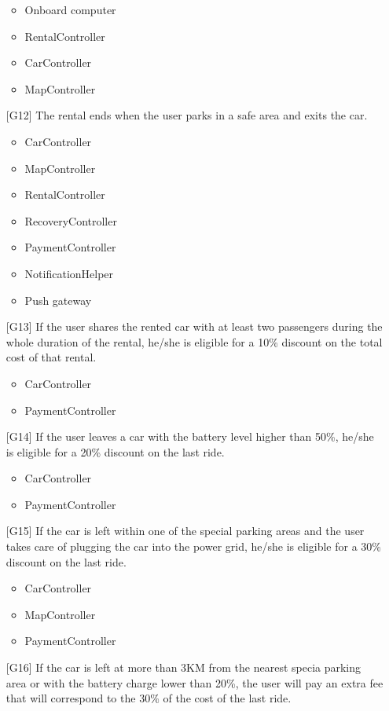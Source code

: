 \begin{itemize}
		\begin{itemize}
			\item Onboard computer
			\item RentalController
			\item CarController
			\item MapController
		\end{itemize}
	\item[{[G12]}] The rental ends when the user parks in a safe area and exits the car.
		\begin{itemize}
			\item CarController
			\item MapController
			\item RentalController
			\item RecoveryController
			\item PaymentController
			\item NotificationHelper
			\item Push gateway
		\end{itemize}
	\item[{[G13]}] If the user shares the rented car with at least two passengers during the whole duration of the rental, he/she is eligible for a 10\% discount on the total cost of that rental.
		\begin{itemize}
			\item CarController
			\item PaymentController
		\end{itemize}
	\item[{[G14]}] If the user leaves a car with the battery level higher than 50\%, he/she is eligible for a 20\% discount on the last ride.
		\begin{itemize}
			\item CarController
			\item PaymentController
		\end{itemize}
	\item[{[G15]}] If the car is left within one of the special parking areas and the user takes care of plugging the car into the power grid, he/she is eligible for a 30\% discount on the last ride.
		\begin{itemize}
			\item CarController
			\item MapController
			\item PaymentController
		\end{itemize}
	\item[{[G16]}] If the car is left at more than 3KM from the nearest specia parking area or with the battery charge lower than 20\%, the user will pay an extra fee that will correspond to the 30\% of the cost of the last ride.

\end{itemize}
